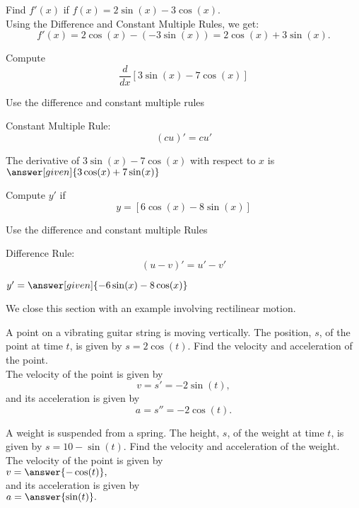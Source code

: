 \documentclass{ximera}
\begin{document}
\begin{example} %
 Find $f'(x)$ if  $f(x) = 2\sin(x) - 3\cos(x).$\\
 Using the Difference and Constant Multiple Rules, we get:
 \[
 f'(x) = 2\cos(x) - (-3\sin(x)) = 2\cos(x) + 3\sin(x).
 \]
\end{example}


\begin{problem} %
  Compute 
  \[
  \frac{d}{dx} \left[3\sin(x) - 7\cos(x)\right]
  \]
  
		\begin{hint}
      Use the difference and constant multiple rules
    \end{hint}
    \begin{hint}
      Constant Multiple Rule:
      \[
      (cu)' = cu'
      \]
    \end{hint}    
		The derivative of $3\sin(x) - 7\cos(x)$ with respect to $x$ is
		 $\answer[given]{3\cos(x) + 7\sin(x)}$
	
\end{problem}

\begin{problem} %
  Compute $y'$ if
  \[
  y= \left[6\cos(x) - 8\sin(x)\right]
  \]
  
		\begin{hint}
      Use the difference and constant multiple Rules
    \end{hint}
    \begin{hint}
      Difference Rule:
      \[
      (u-v)' = u' - v'
      \]
    \end{hint}    
		
  $y' = \answer[given]{-6\sin(x) - 8\cos(x)}$
	
\end{problem}

We close this section with an example involving rectilinear motion.

\begin{example}
A point on a vibrating guitar string is moving vertically.
The position, $s$, of the point at time $t$, is given by $s = 2\cos(t)$.  Find the velocity and acceleration of the point.\\
The velocity of the point is given by 
\[
v = s' = -2\sin(t),
\]
and its acceleration is given by 
\[
a = s'' = -2\cos(t).
\]

\end{example}

\begin{problem}
A weight is suspended from a spring.
The height, $s$, of the weight at time $t$, is given by $s = 10-\sin(t)$.  Find the velocity and acceleration of the weight.\\
The velocity of the point is given by\\
 $v = \answer{ -\cos(t)},$ \\
and its acceleration is given by\\
 $a = \answer{\sin(t)}.$
\end{problem}
\end{document}
